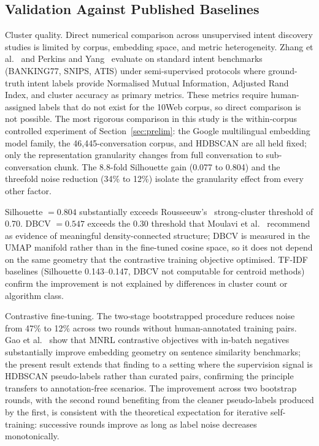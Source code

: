 \documentclass[conference]{IEEEtran}
\begin{document}
\subsection{Validation Against Published Baselines}

Cluster quality. Direct numerical comparison across unsupervised intent discovery studies is limited by corpus, embedding space, and metric heterogeneity. Zhang et al.~\cite{zhang2021new} and Perkins and Yang~\cite{perkins2019dialog} evaluate on standard intent benchmarks (BANKING77, SNIPS, ATIS) under semi-supervised protocols where ground-truth intent labels provide Normalised Mutual Information, Adjusted Rand Index, and cluster accuracy as primary metrics. These metrics require human-assigned labels that do not exist for the 10Web corpus, so direct comparison is not possible. The most rigorous comparison in this study is the within-corpus controlled experiment of Section~\ref{sec:prelim}: the Google multilingual embedding model family, the 46{,}445-conversation corpus, and HDBSCAN are all held fixed; only the representation granularity changes from full conversation to sub-conversation chunk. The 8.8-fold Silhouette gain (0.077 to 0.804) and the threefold noise reduction (34\% to 12\%) isolate the granularity effect from every other factor.

Silhouette $= 0.804$ substantially exceeds Rousseeuw's~\cite{rousseeuw1987silhouettes} strong-cluster threshold of 0.70. DBCV $= 0.547$ exceeds the 0.30 threshold that Moulavi et al.~\cite{moulavi2014dbcv} recommend as evidence of meaningful density-connected structure; DBCV is measured in the UMAP manifold rather than in the fine-tuned cosine space, so it does not depend on the same geometry that the contrastive training objective optimised. TF-IDF baselines (Silhouette 0.143--0.147, DBCV not computable for centroid methods) confirm the improvement is not explained by differences in cluster count or algorithm class.

Contrastive fine-tuning. The two-stage bootstrapped procedure reduces noise from 47\% to 12\% across two rounds without human-annotated training pairs. Gao et al.~\cite{gao2021simcse} show that MNRL contrastive objectives with in-batch negatives substantially improve embedding geometry on sentence similarity benchmarks; the present result extends that finding to a setting where the supervision signal is HDBSCAN pseudo-labels rather than curated pairs, confirming the principle transfers to annotation-free scenarios. The improvement across two bootstrap rounds, with the second round benefiting from the cleaner pseudo-labels produced by the first, is consistent with the theoretical expectation for iterative self-training: successive rounds improve as long as label noise decreases monotonically.
\end{document}
